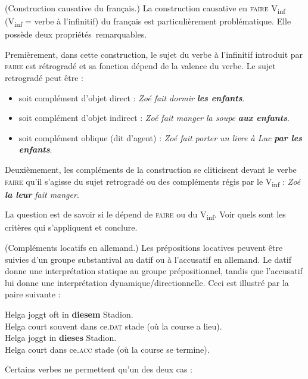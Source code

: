 {     (Construction causative du français.) La construction causative en \textsc{faire} V\textsubscript{inf}
     (V\textsubscript{inf} = verbe à l’infinitif) du français est particulièrement problématique. Elle possède deux propriétés~remarquables.

    Premièrement, dans cette construction, le sujet du verbe à l’infinitif introduit par \textsc{faire} est rétrogradé et sa fonction dépend de la valence du verbe. Le sujet retrogradé peut être :
    \begin{itemize}
    \item  soit complément d’objet direct : \textit{Zoé fait dormir} \textbf{\textit{les enfants}}.
    \item  soit complément d’objet indirect : \textit{Zoé fait manger la soupe} \textbf{\textit{aux enfants}}.
    \item  soit complément oblique (dit d’agent) : \textit{Zoé fait porter un livre à Luc} \textbf{\textit{par les enfants}}.
    \end{itemize}
    Deuxièmement, les compléments de la construction se cliticisent devant le verbe \textsc{faire} qu’il s’agisse du sujet retrogradé ou des compléments régis par le V\textsubscript{inf} : \textit{Zoé} \textbf{\textit{la leur}} \textit{fait manger}.

    La question est de savoir si le  dépend de \textsc{faire} ou du V\textsubscript{inf}. Voir quels sont les critères qui s’appliquent et conclure.

     (Compléments locatifs en allemand.) Les prépositions locatives peuvent être suivies d’un groupe substantival au datif ou à l’accusatif en allemand. Le datif donne une interprétation statique au groupe prépositionnel, tandis que l’accusatif lui donne une interprétation dynamique/directionnelle. Ceci est illustré par la paire suivante :

    \begin{exe}
    \gll   Helga joggt oft in \textbf{diesem} Stadion.\\
    Helga court souvent dans ce.\textsc{dat} stade (où la course a lieu).\\
    \gll   Helga joggt in \textbf{dieses} Stadion.\\
    Helga court dans ce.\textsc{acc} stade (où la course se termine).\\
    \end{exe}
    
   \noindent Certains verbes ne permettent qu’un des deux cas :

}
